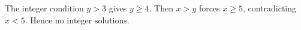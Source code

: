 The integer condition $y>3$ gives $y\ge4$. Then $x>y$ forces $x\ge5$, contradicting $x<5$. Hence $\boxed{\text{no integer solutions}}$.
